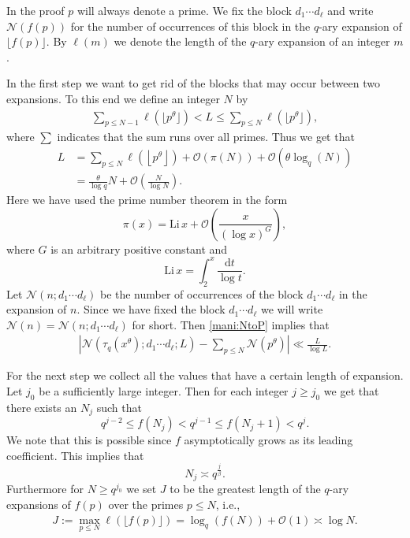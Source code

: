 \documentclass[a4paper,10pt]{amsart}
\numberwithin{equation}{section}
\theoremstyle{definition}
\theoremstyle{remark}
\newcommand{\lf}{\left\lfloor}
\newcommand{\rf}{\right\rfloor}
\renewcommand{\lvert}{\left\vert}
\renewcommand{\rvert}{\right\vert}
\begin{document}
In the proof $p$ will always denote a prime. We fix the block
$d_1\cdots d_\ell$ and write $\mathcal{N}(f(p))$ for the number of occurrences of
this block in the $q$-ary expansion of $\lfloor f(p)\rfloor$. By $\ell(m)$ we
denote the length of the $q$-ary expansion of an integer $m$.

In the first step we want to get rid of the blocks that may occur between two
expansions. To this end we define an integer $N$ by
\begin{gather}\label{mani:P}
\sum_{p\leq N-1}\ell\left(\lfloor p^\theta\rfloor\right) <L\leq
\sum_{p\leq N}\ell\left(\lfloor p^\theta\rfloor\right),
\end{gather}
where $\sum$ indicates that the sum runs over all primes. Thus we get that
\begin{equation}\label{mani:NtoP}
\begin{split}
L&=\sum_{p\leq N}\ell(\lf p^\theta\rf)+\mathcal{O}(\pi(N))+\mathcal{O}(\theta \log_q(N))\\
&=\frac{\theta}{\log q}N+\mathcal{O}\left(\frac{N}{\log N}\right).
\end{split}\end{equation}
Here we have used the prime number theorem in the form
\[
  \pi(x)=\mathrm{Li}\, x+\mathcal{O}\left(\frac x{(\log x)^G}\right),
\]
where $G$ is an arbitrary positive constant and
\[
  \mathrm{Li}\,x=\int_2^x\frac{\mathrm{d}t}{\log t}.
\]
Let $\mathcal{N}(n;d_1\cdots d_\ell)$ be the number of occurrences of the block
$d_1\cdots d_\ell$ in the expansion of $n$. Since we have fixed the block
$d_1\cdots d_\ell$ we will write $\mathcal{N}(n)=\mathcal{N}(n;d_1\cdots
d_\ell)$ for short. Then \eqref{mani:NtoP} implies that
\begin{gather}\label{mani:Ntrunc}
  \lvert\mathcal{N}(\tau_q(x^\theta);d_1\cdots d_\ell;L)-\sum_{p\leq
    N}\mathcal{N}(p^\theta)\rvert\ll\frac L{\log L}.
\end{gather}

For the next step we collect all the values that have a certain length of
expansion. Let $j_0$ be a sufficiently large integer. Then for each
integer $j\geq j_0$ we get that there exists an $N_j$ such that
\[
  q^{j-2}\leq f(N_j)<q^{j-1}\leq f(N_j+1)<q^j.
\]
We note that this is possible since $f$ asymptotically grows as its leading
coefficient. This implies that
\[
  N_j\asymp q^{\frac j\beta}.
\]
Furthermore for $N\geq q^{j_0}$
we set $J$ to be the greatest length of the $q$-ary expansions of $f(p)$ over
the primes $p\leq N$, i.e.,
\begin{gather}\label{mani:JP}
J:=\max_{p\leq N}\ell(\lfloor f(p)\rfloor)=\log_q(f(N))+\mathcal{O}(1)\asymp\log
N.
\end{gather}
\end{document}
